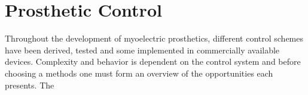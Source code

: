 \section{Prosthetic Control}

Throughout the development of myoelectric prosthetics, different control schemes have been derived, tested and some implemented in commercially available devices. Complexity and behavior is dependent on the control system and before choosing a methods one must form an overview of the opportunities each presents. The 